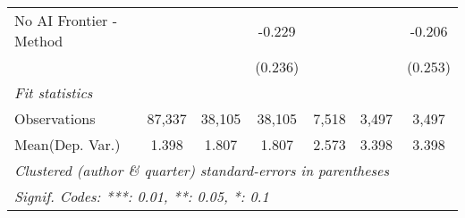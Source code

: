 \begin{tabular}{lcccccc}
   No AI Frontier - Method &                &              & -0.229        &         &         & -0.206\\   
                           &                &              & (0.236)       &         &         & (0.253)\\   
   \midrule
   \emph{Fit statistics}\\
   Observations            & 87,337         & 38,105       & 38,105        & 7,518   & 3,497   & 3,497\\  
Mean(Dep. Var.) & 1.398 & 1.807 & 1.807 & 2.573 & 3.398 & 3.398 \\
   \midrule \midrule
   \multicolumn{7}{l}{\emph{Clustered (author \& quarter) standard-errors in parentheses}}\\
   \multicolumn{7}{l}{\emph{Signif. Codes: ***: 0.01, **: 0.05, *: 0.1}}\\
\end{tabular}
\par\endgroup

